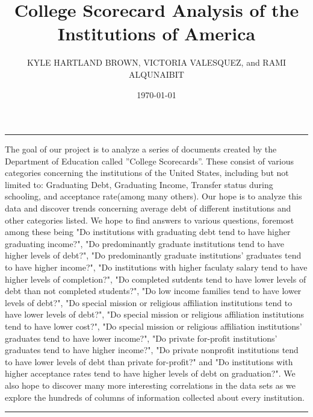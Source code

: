 \documentclass[11pt]{article}
\author{KYLE HARTLAND BROWN, VICTORIA VALESQUEZ, and RAMI ALQUNAIBIT}
\date{\today}
\title{College Scorecard Analysis of the Institutions of America}
\begin{document}
\maketitle


\rule{\linewidth}{0.5pt}


The goal of our project is to analyze a series of documents created by the Department of Education called ”College Scorecards”. These consist of various categories concerning the institutions of the United States, including but not limited to: Graduating Debt, Graduating Income, Transfer status during schooling, and acceptance rate(among many others). Our hope is to analyze this data and discover trends concerning average debt of different institutions and other categories listed. We hope to find answers to various questions, foremost among these being "Do institutions with graduating debt tend to have higher graduating income?", "Do predominantly graduate institutions tend to have higher levels of debt?", "Do predominantly graduate institutions' graduates tend to have higher income?", "Do institutions with higher faculaty salary tend to have higher levels of completion?", "Do completed sutdents tend to have lower levels of debt than not completed students?", "Do low income families tend to have lower levels of debt?", "Do special mission or religious affiliation institutions tend to have lower levels of debt?", "Do special mission or religious affiliation institutions tend to have lower cost?", "Do special mission or religious affiliation institutions' graduates tend to have lower income?", "Do private for-profit institutions' graduates tend to have higher income?", "Do private nonprofit institutions tend to have lower levels of debt than private for-profit?" and "Do institutions with higher acceptance rates tend to have higher levels of debt on graduation?". We also hope to discover many more interesting correlations in the data sets as we explore the hundreds of columns of information collected about every institution.

\rule{\linewidth}{0.5pt}
\end{document}
